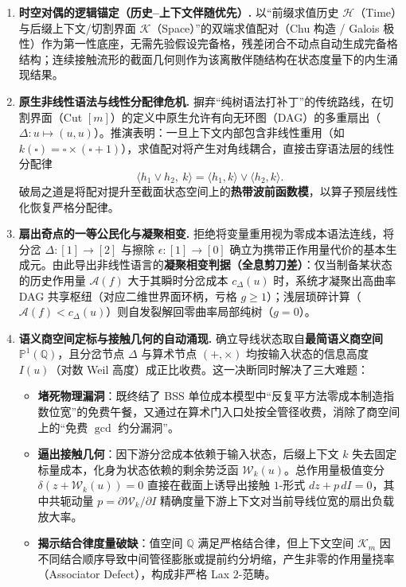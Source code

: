 \documentclass[11pt,a4paper]{ctexart}
\theoremstyle{plain}
\theoremstyle{definition}
\newcommand{\PP}{\mathbb{P}}
\newcommand{\QQ}{\mathbb{Q}}
\newcommand{\cA}{\mathcal{A}}
\newcommand{\cH}{\mathcal{H}}
\newcommand{\cK}{\mathcal{K}}
\newcommand{\cW}{\mathcal{W}}
\begin{document}
\begin{enumerate}
\item \textbf{时空对偶的逻辑锚定（历史--上下文伴随优先）.}
以“前缀求值历史 $\cH$（Time）与后缀上下文/切割界面 $\cK$（Space）”的双端求值配对（Chu 构造 / Galois 极性）作为第一性底座，无需先验假设完备格，残差闭合不动点自动生成完备格结构；连续接触流形的截面几何则作为该离散伴随结构在状态度量下的内生涌现结果。

\item \textbf{原生非线性语法与线性分配律危机.}
摒弃“纯树语法打补丁”的传统路线，在切割界面（Cut $[m]$）的定义中原生允许有向无环图（DAG）的多重扇出（$\Delta: u \mapsto (u, u)$）。推演表明：一旦上下文内部包含非线性重用（如 $k(\square) = \square \times (\square + 1)$），求值配对将产生对角线耦合，直接击穿语法层的线性分配律
\[
\langle h_1 \vee h_2,\ k \rangle = \langle h_1, k \rangle \vee \langle h_2, k \rangle .
\]
破局之道是将配对提升至截面状态空间上的\textbf{热带波前函数模}，以算子预层线性化恢复严格分配律。

\item \textbf{扇出奇点的一等公民化与凝聚相变.}
拒绝将变量重用视为零成本语法连线，将分岔 $\Delta: [1] \to [2]$ 与擦除 $\epsilon: [1] \to [0]$ 确立为携带正作用量代价的基本生成元。由此导出非线性语言的\textbf{凝聚相变判据（全息剪刀差）}：仅当制备某状态的历史作用量 $\cA(f)$ 大于其瞬时分岔成本 $c_\Delta(u)$ 时，系统才凝聚出高曲率 DAG 共享枢纽（对应二维世界面环柄，亏格 $g \ge 1$）；浅层琐碎计算（$\cA(f) < c_\Delta(u)$）则自发裂解回零曲率局部纯树（$g = 0$）。

\item \textbf{语义商空间定标与接触几何的自动涌现.}
确立导线状态取自\textbf{最简语义商空间} $\PP^1(\QQ)$，且分岔节点 $\Delta$ 与算术节点 $(+, \times)$ 均按输入状态的信息高度 $I(u)$（对数 Weil 高度）成正比收费。这一决断同时解决了三大难题：
\begin{itemize}
\item \textbf{堵死物理漏洞}：既终结了 BSS 单位成本模型中“反复平方法零成本制造指数位宽”的免费午餐，又通过在算术门入口处按全管径收费，消除了商空间上的“免费 $\gcd$ 约分漏洞”。
\item \textbf{逼出接触几何}：因下游分岔成本依赖于输入状态，后缀上下文 $k$ 失去固定标量成本，化身为状态依赖的剩余势泛函 $\cW_k(u)$。总作用量极值变分 $\delta(z + \cW_k(u)) = 0$ 直接在截面上诱导出接触 $1$-形式 $dz + p\,dI = 0$，其中共轭动量 $p = \partial \cW_k / \partial I$ 精确度量下游上下文对当前导线位宽的扇出负载放大率。
\item \textbf{揭示结合律度量破缺}：值空间 $\QQ$ 满足严格结合律，但上下文空间 $\cK_m$ 因不同结合顺序导致中间管径膨胀或提前约分坍缩，产生非零的作用量挠率（Associator Defect），构成非严格 Lax $2$-范畴。
\end{itemize}


\end{enumerate}
\end{document}
